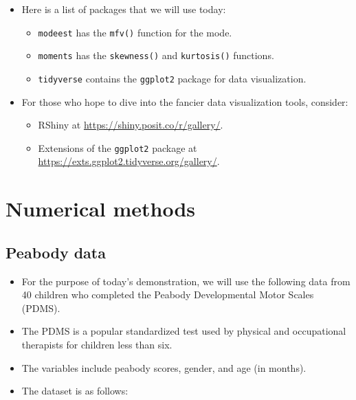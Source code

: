\documentclass[
]{book}
\providecommand{\tightlist}{%
  \setlength{\itemsep}{0pt}\setlength{\parskip}{0pt}}
\begin{document}
\begin{itemize}
\tightlist
\item
  Here is a list of packages that we will use today:

  \begin{itemize}
  \tightlist
  \item
    \texttt{modeest} has the \texttt{mfv()} function for the mode.
  \item
    \texttt{moments} has the \texttt{skewness()} and \texttt{kurtosis()} functions.
  \item
    \texttt{tidyverse} contains the \texttt{ggplot2} package for data visualization.
  \end{itemize}
\item
  For those who hope to dive into the fancier data visualization tools, consider:

  \begin{itemize}
  \tightlist
  \item
    RShiny at \url{https://shiny.posit.co/r/gallery/}.
  \item
    Extensions of the \texttt{ggplot2} package at \url{https://exts.ggplot2.tidyverse.org/gallery/}.
  \end{itemize}
\end{itemize}

\section{Numerical methods}\label{numerical-methods}

\subsection{Peabody data}\label{peabody-data}

\begin{itemize}
\item
  For the purpose of today's demonstration, we will use the following data from 40 children who completed the Peabody Developmental Motor Scales (PDMS).
\item
  The PDMS is a popular standardized test used by physical and occupational therapists for children less than six.
\item
  The variables include peabody scores, gender, and age (in months).
\item
  The dataset is as follows:
\end{itemize}
\end{document}
